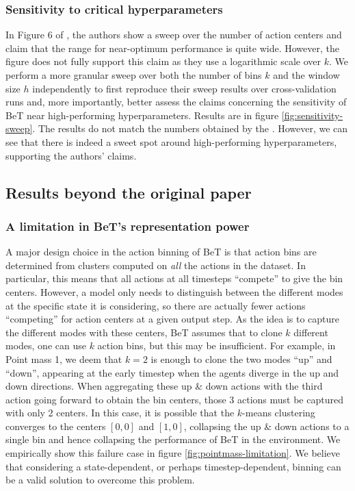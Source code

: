 \subsubsection{Sensitivity to critical hyperparameters}\label{results:sensitivity}
In Figure 6 of \citet{shafiullah2022behavior}, the authors show a sweep over the number of action centers and claim that the range for near-optimum performance is quite wide.
However, the figure does not fully support this claim as they use a logarithmic scale over $k$.
We perform a more granular sweep over both the number of bins $k$ and the window size $h$ independently to first reproduce their sweep results over cross-validation runs and, more importantly, better assess the claims concerning the sensitivity of BeT near high-performing hyperparameters.
Results are in figure \ref{fig:sensitivity-sweep}.
The results do not match the numbers obtained by the \citet{shafiullah2022behavior}. However, we can see that there is indeed a sweet spot around high-performing hyperparameters, supporting the authors' claims.

\subsection{Results beyond the original paper}\label{sec:results_beyond_paper}

\subsubsection{A limitation in BeT's representation power}\label{results:sensitivity-k}

A major design choice in the action binning of BeT is that action bins are determined from clusters computed on \emph{all} the actions in the dataset.
In particular, this means that all actions at all timesteps ``compete'' to give the bin centers.
However, a model only needs to distinguish between the different modes at the specific state it is considering, so there are actually fewer actions ``competing'' for action centers at a given output step.
As the idea is to capture the different modes with these centers, BeT assumes that to clone $k$ different modes, one can use $k$ action bins, but this may be insufficient.
For example, in Point mass 1, we deem that $k=2$ is enough to clone the two modes ``up'' and ``down'', appearing at the early timestep when the agents diverge in the up and down directions.
When aggregating these up \& down actions with the third action going forward to obtain the bin centers, those 3 actions must be captured with only 2 centers.
In this case, it is possible that the $k$-means clustering converges to the centers $[0,0]$ and $[1,0]$, collapsing the up \& down actions to a single bin and hence collapsing the performance of BeT in the environment.
We empirically show this failure case in figure \ref{fig:pointmass-limitation}.
We believe that considering a state-dependent, or perhaps timestep-dependent, binning can be a valid solution to overcome this problem.

